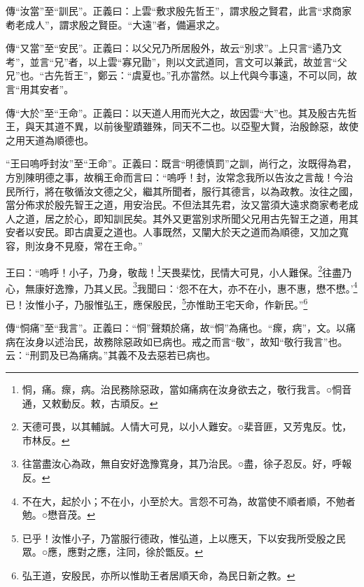 {\noindent\zhuan{}\fzbyks 傳“汝當”至“訓民”。正義曰：上雲“敷求殷先哲王”，謂求殷之賢君，此言“求商家耇老成人”，謂求殷之賢臣。“大遠”者，備遍求之。 \par}

{\noindent\zhuan{}\fzbyks 傳“又當”至“安民”。正義曰：以父兄乃所居殷外，故云“別求”。上只言“遹乃文考”，並言“兄”者，以上雲“寡兄勖”，則以文武道同，言文可以兼武，故並言“父兄”也。“古先哲王”，鄭云：“虞夏也。”孔亦當然。以上代與今事遠，不可以同，故言“用其安者”。 \par}

{\noindent\zhuan{}\fzbyks 傳“大於”至“王命”。正義曰：以天道人用而光大之，故因雲“大”也。其及殷古先哲王，與天其道不異，以前後聖蹟雖殊，同天不二也。以亞聖大賢，治殷餘惡，故使之用天道為順德也。 \par}

{\noindent\shu{}\fzkt “王曰嗚呼封汝”至“王命”。正義曰：既言“明德慎罰”之訓，尚行之，汝既得為君，方別陳明德之事，故稱王命而言曰：“嗚呼！封，汝常念我所以告汝之言哉！今治民所行，將在敬循汝文德之父，繼其所聞者，服行其德言，以為政教。汝往之國，當分佈求於殷先智王之道，用安治民。不但法其先君，汝又當須大遠求商家耇老成人之道，居之於心，即知訓民矣。其外又更當別求所聞父兄用古先智王之道，用其安者以安民。即古虞夏之道也。人事既然，又闡大於天之道而為順德，又加之寬容，則汝身不見廢，常在王命。” \par}

王曰：“嗚呼！小子，乃身，敬哉！\footnote{恫，痛。瘝，病。治民務除惡政，當如痛病在汝身欲去之，敬行我言。○恫音通，又敕動反。敕，古頑反。}天畏棐忱，民情大可見，小人難保。\footnote{天德可畏，以其輔誠。人情大可見，以小人難安。○棐音匪，又芳鬼反。忱，巿林反。}往盡乃心，無康好逸豫，乃其乂民。\footnote{往當盡汝心為政，無自安好逸豫寬身，其乃治民。○盡，徐子忍反。好，呼報反。}我聞曰：‘怨不在大，亦不在小，惠不惠，懋不懋。’\footnote{不在大，起於小；不在小，小至於大。言怨不可為，故當使不順者順，不勉者勉。○懋音茂。}已！汝惟小子，乃服惟弘王，應保殷民，\footnote{已乎！汝惟小子，乃當服行德政，惟弘道，上以應天，下以安我所受殷之民眾。○應，應對之應，注同，徐於甑反。}亦惟助王宅天命，作新民。”\footnote{弘王道，安殷民，亦所以惟助王者居順天命，為民日新之教。}


{\noindent\zhuan{}\fzbyks 傳“恫痛”至“我言”。正義曰：“恫”聲類於痛，故“恫”為痛也。“瘝，病”，文。以痛病在汝身以述治民，故務除惡政如已病也。戒之而言“敬”，故知“敬行我言”也。云：“刑罰及已為痛病。”其義不及去惡若已病也。 \par}

